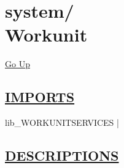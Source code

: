 \chapter*{\color{headfile}
{\large system\slash\hspace{0pt}}
 \\
Workunit
}
\hypertarget{ecldoc:toc:system.Workunit}{}
\hyperlink{ecldoc:toc:root/system}{Go Up}

\section*{\underline{\textsf{IMPORTS}}}
\begin{doublespace}
{\large
lib\_WORKUNITSERVICES |
}
\end{doublespace}

\section*{\underline{\textsf{DESCRIPTIONS}}}
